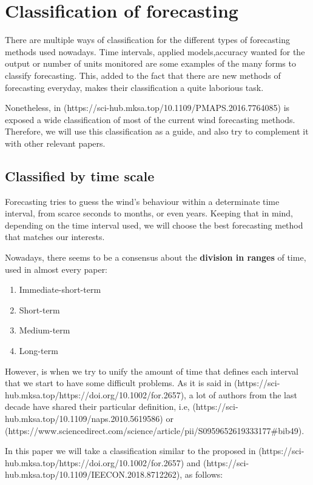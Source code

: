 \section{Classification of forecasting}

There are multiple ways of classification for the different types of forecasting methods used nowadays. Time intervals, applied models,accuracy wanted for the output or number of units monitored are some examples of the many forms to classify forecasting. This, added to the fact that there are new methods of forecasting everyday, makes their classification a quite laborious task.

Nonetheless, in (https://sci-hub.mksa.top/10.1109/PMAPS.2016.7764085) is exposed a wide classification of most of the current wind forecasting methods. Therefore, we will use this classification as a guide, and also try to complement it with other relevant papers.

\subsection{Classified by time scale}

Forecasting tries to guess the wind's behaviour within a determinate time interval, from scarce seconds to months, or even years. Keeping that in mind, depending on the time interval used, we will choose the best forecasting method that matches our interests.

Nowadays, there seems to be a consensus about the \textbf{division in ranges} of time, used in almost every paper:

\begin{enumerate}
    \item Immediate-short-term
    \item Short-term
    \item Medium-term
    \item Long-term
\end{enumerate}

However, is when we try to unify the amount of time that defines each interval that we start to have some difficult problems. As it is said in (https://sci-hub.mksa.top/https://doi.org/10.1002/for.2657), a lot of authors from the last decade have shared their particular definition, i.e, (https://sci-hub.mksa.top/10.1109/naps.2010.5619586) or (https://www.sciencedirect.com/science/article/pii/S0959652619333177\#bib49).

In this paper we will take a classification similar to the proposed in (https://sci-hub.mksa.top/https://doi.org/10.1002/for.2657) and (https://sci-hub.mksa.top/10.1109/IEECON.2018.8712262), as follows:


